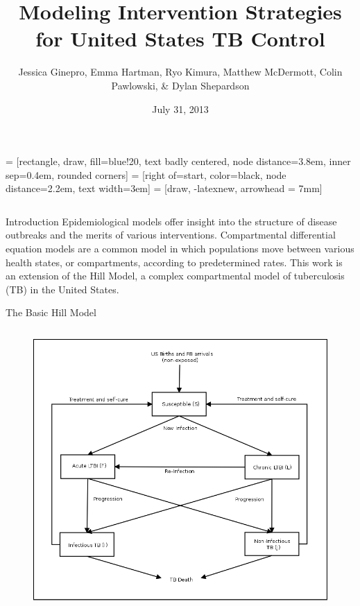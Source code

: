 \documentclass[final]{beamer}
\title{\huge Modeling Intervention Strategies for United States TB Control}
\author{Jessica Ginepro, Emma Hartman, Ryo Kimura, Matthew McDermott, Colin
        Pawlowski, \& Dylan Shepardson}
\institute[MHC]{Mathematical Modeling Group, Mount Holyoke College, South
                Hadley, MA, USA}
\date[July 31, 2013]{July 31, 2013}
\begin{document}
 = [rectangle, draw, fill=blue!20, text badly centered,
  node distance=3.8em, inner sep=0.4em, rounded corners]
 = [right of=start, color=black, node distance=2.2em,
text width=3em]
 = [draw, -latexnew, arrowhead = 7mm]


\begin{frame}
  \begin{columns}[T]
    \begin{column}{.3\textwidth}
      \begin{block}{Introduction}
        Epidemiological models offer insight into the structure of disease outbreaks and the merits of various interventions.  Compartmental differential equation models are a common model in which populations move between various health states, or compartments, according to predetermined rates.  This work is an extension of the Hill Model, a complex compartmental model of tuberculosis (TB) in the United States.
      \end{block}
      \vspace{1em}
      \begin{block}{The Basic Hill Model}
        \begin{columns}[T]
          \begin{column}{.5\textwidth}
            \begin{figure}[h]
              \begin{center}
                \includegraphics[width=\textwidth]{HillModelFlowChart}

\end{center}
\end{figure}
\end{column}
\end{columns}
\end{block}
\end{column}
\end{columns}
\end{frame}
\end{document}

